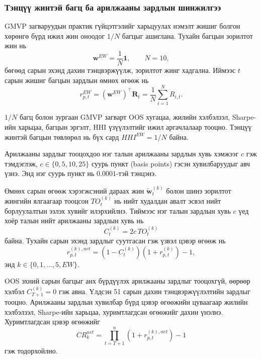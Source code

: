 
\subsubsection{Тэнцүү жинтэй багц ба арилжааны зардлын шинжилгээ}
\label{subsubsec:equal_weight_costs}

GMVP загваруудын практик гүйцэтгэлийг
харьцуулах нэмэлт жишиг болгон хөрөнгө бүрд
ижил жин оноодог $1/N$ багцыг ашиглана.
Тухайн багцын зорилтот жин нь
\[
\boldsymbol{w}^{EW}=\frac{1}{N}\boldsymbol{1},
\qquad N=10,
\]
бөгөөд сарын эхэнд дахин тэнцвэржүүлж,
зорилтот жинг хадгална. Иймээс $t$ сарын
жишиг багцын зардлын өмнөх өгөөж нь
\[
r_{p,t}^{EW}
=\left(\boldsymbol{w}^{EW}\right)^\top
\boldsymbol{R}_t
=\frac{1}{N}\sum_{i=1}^{N}R_{i,t}.
\]

$1/N$ багц болон зургаан GMVP загварт
OOS хугацаа, жилийн хэлбэлзэл, Sharpe-ийн
харьцаа, багцын эргэлт, HHI үзүүлэлтийг
ижил аргачлалаар тооцно. Тэнцүү жинтэй
багцын төвлөрөл нь бүх сард
$HHI^{EW}=1/N$ байна.

Арилжааны зардлыг тооцохдоо нэг талын
арилжааны зардлын хувь хэмжээг $c$ гэж
тэмдэглэж, $c\in\{0,5,10,25\}$ суурь
пункт (basis points) гэсэн хувилбаруудыг
авч үзнэ. Энд нэг суурь пункт нь
$0.0001$-тэй тэнцэнэ.

Өмнөх сарын өгөөж хэрэгжсэний дараах
жин $\widetilde{\boldsymbol{w}}_t^{(k)}$
болон шинэ зорилтот жингийн ялгаагаар
тооцсон $TO_t^{(k)}$ нь нийт худалдан
авалт эсвэл нийт борлуулалтын эзлэх хувийг
илэрхийлнэ. Тиймээс нэг талын зардлын
хувь $c$ үед хоёр талын нийт арилжааны
зардлын хувь нь
\[
C_t^{(k)}=2c\,TO_t^{(k)}
\]
байна. Тухайн сарын эхэнд зардлыг
суутгасан гэж үзвэл цэвэр өгөөж нь
\[
r_{p,t}^{(k),net}
=\left(1-C_t^{(k)}\right)
\left(1+r_{p,t}^{(k)}\right)-1,
\]
энд $k\in\{0,1,\ldots,5,EW\}$.

OOS эхний сарын багцыг анх бүрдүүлэх
арилжааны зардлыг тооцохгүй, өөрөөр
хэлбэл $C_{T+1}^{(k)}=0$ гэж авна.
Үлдсэн 51 сарын дахин тэнцвэржүүлэлтийн
зардлыг тооцно. Арилжааны зардлын
хувилбар бүрд цэвэр өгөөжийн цуваагаар
жилийн хэлбэлзэл, Sharpe-ийн харьцаа,
хуримтлагдсан өгөөжийг дахин үнэлнэ.
Хуримтлагдсан цэвэр өгөөжийг
\[
CR_k^{net}
=\prod_{t=T+1}^{n}
\left(1+r_{p,t}^{(k),net}\right)-1
\]
гэж тодорхойлно.


